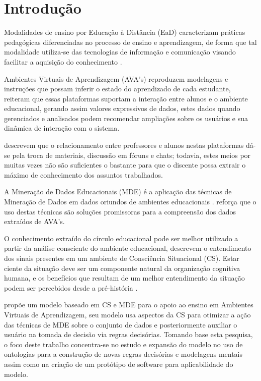 \documentclass[
	oneside,
	12pt,				%
	a4paper,			%
	english,			%
	brazil,				%
	article
	]{abntex2}
\begin{document}
\section{Introdução}

Modalidades de ensino por Educação à Distância (EaD) caracterizam práticas pedagógicas diferenciadas no processo de ensino e aprendizagem, de forma que tal modalidade utiliza-se das tecnologias de informação e comunicação visando facilitar a aquisição do conhecimento \cite{Rabelo_et_al2017}.

Ambientes Virtuais de Aprendizagem (AVA’s) reproduzem modelagens e instruções que possam inferir o estado do aprendizado de cada estudante,  reiteram que essas plataformas suportam a interação entre alunos e o ambiente educacional, gerando assim valores expressivos de dados, estes dados quando gerenciados e analisados podem recomendar ampliações sobre os usuários e sua dinâmica de interação com o sistema.

 descrevem que o relacionamento entre professores e alunos nestas plataformas dá-se pela troca de materiais, discussão em fóruns e chats; todavia, estes meios por muitas vezes não são suficientes o bastante para que o discente possa extrair o máximo de conhecimento dos assuntos trabalhados.

A Mineração de Dados Educacionais (MDE) é a aplicação das técnicas de Mineração de Dados em dados oriundos de ambientes educacionais \cite{Romero_Ventura_2013}.  reforça que o uso destas técnicas são soluções promissoras para a compreensão dos dados extraídos de AVA's. 

O conhecimento extraído do círculo educacional pode ser melhor utilizado a partir da análise consciente do ambiente educacional,  descrevem o entendimento dos sinais presentes em um ambiente de Consciência Situacional (CS). Estar ciente da situação deve ser um componente natural da organização cognitiva humana, e os benefícios que resultam de um melhor entendimento da situação podem ser percebidos desde a pré-história \cite{Roy_Breton_Rousseau_2007}.

 propõe um modelo baseado em CS e MDE para o apoio ao ensino em Ambientes Virtuais de Aprendizagem, seu modelo usa aspectos da CS para otimizar a ação das técnicas de MDE sobre o conjunto de dados e posteriormente auxiliar o usuário na tomada de decisão via regras decisórias. Tomando base esta pesquisa, o foco deste trabalho concentra-se no estudo e expansão do modelo no uso de ontologias para a construção de novas regras decisórias e modelagens mentais assim como na criação de um protótipo de software para aplicabilidade do modelo.
\end{document}
